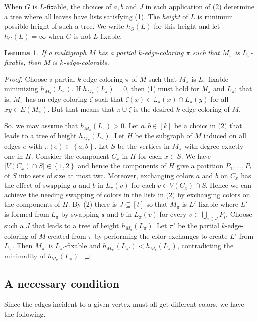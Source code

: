 \documentclass[12pt]{article}
\theoremstyle{plain}
\newtheorem{lem}[thm]{Lemma}
\theoremstyle{definition}
\theoremstyle{remark}
\newcommand{\set}[1]{\left\{ #1 \right\}}
\newcommand{\card}[1]{\left|#1\right|}
\newcommand{\irange}[1]{\left[#1\right]}
\newcommand{\parens}[1]{\left( #1 \right)}
\begin{document}
When $G$ is $L$-fixable, the choices of $a,b$ and $J$ in each application of (2) determine a tree where all leaves have lists satisfying (1).  The \emph{height} of $L$ is minimum possible height of such a tree.  We write $h_G(L)$ for this height and let $h_G(L) = \infty$ when $G$ is not $L$-fixable. 

\begin{lem}\label{FixableCompletesColoring}
If a multigraph $M$ has a partial $k$-edge-coloring $\pi$ such that $M_\pi$ is $L_\pi$-fixable, then $M$ is $k$-edge-colorable.
\end{lem}
\begin{proof}
Choose a partial $k$-edge-coloring $\pi$ of $M$ such that $M_\pi$ is $L_\pi$-fixable minimizing $h_{M_\pi}\parens{L_\pi}$. If $h_{M_\pi}\parens{L_\pi} = 0$, then (1) must hold for $M_\pi$ and $L_\pi$; that is, $M_\pi$ has an edge-coloring $\zeta$ such that $\zeta(x) \in L_\pi(x) \cap L_\pi(y)$ for all $xy \in E(M_\pi)$.  But that means that $\pi \cup \zeta$ is the desired $k$-edge-coloring of $M$.  

So, we may assume that $h_{M_\pi}\parens{L_\pi} > 0$.  Let $a,b \in \irange{k}$ be a choice in (2) that leads to a tree of height $h_{M_\pi}\parens{L_\pi}$.  Let $H$ be the subgraph of $M$ induced on all edges $e$ with $\pi(e) \in \set{a,b}$.  Let $S$ be the vertices in $M_\pi$ with degree exactly one in $H$.  Consider the component $C_x$ in $H$ for each $x \in S$.  We have $\card{V(C_x) \cap S} \in \set{1,2}$ and hence the components of $H$ give a partition $P_1, \ldots, P_t$ of $S$ into sets of size at most two.  Moreover, exchanging colors $a$ and $b$ on $C_x$ has the effect of swapping $a$ and $b$ in $L_\pi(v)$ for each $v \in V(C_x) \cap S$.  Hence we can achieve the needing swapping of colors in the lists in (2) by exchanging colors on the components of $H$.  By (2) there is $J \subseteq \irange{t}$ so that $M_\pi$ is $L'$-fixable where $L'$ is formed from $L_\pi$ by swapping $a$ and $b$ in $L_\pi(v)$ for every $v \in \bigcup_{i \in J} P_i$.  Choose such a $J$ that leads to a tree of height $h_{M_\pi}\parens{L_\pi}$.  Let $\pi'$ be the partial $k$-edge-coloring of $M$ created from $\pi$ by performing the color exchanges to create $L'$ from $L_\pi$.  Then $M_{\pi'}$ is $L_{\pi'}$-fixable and $h_{M_{\pi'}}\parens{L_{\pi'}} < h_{M_\pi}\parens{L_\pi}$, contradicting the minimality of $h_{M_\pi}\parens{L_\pi}$.
\end{proof}

\subsection{A necessary condition}
Since the edges incident to a given vertex must all get different colors, we have the following.
\end{document}
